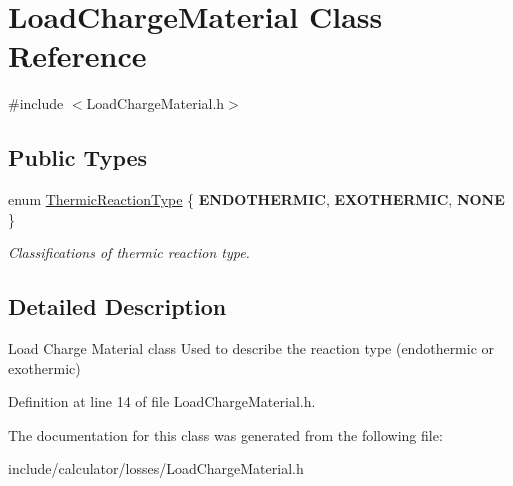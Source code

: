 \hypertarget{class_load_charge_material}{}\section{Load\+Charge\+Material Class Reference}
\label{class_load_charge_material}


{\ttfamily \#include $<$Load\+Charge\+Material.\+h$>$}

\subsection*{Public Types}
\begin{DoxyCompactItemize}
\item 
\mbox{\label{class_load_charge_material_a51d4263e865a5d86236622dd3fe23fd1}} 
enum \hyperlink{class_load_charge_material_a51d4263e865a5d86236622dd3fe23fd1}{Thermic\+Reaction\+Type} \{ {\bfseries E\+N\+D\+O\+T\+H\+E\+R\+M\+IC}, 
{\bfseries E\+X\+O\+T\+H\+E\+R\+M\+IC}, 
{\bfseries N\+O\+NE}
 \}\begin{DoxyCompactList}\small\item\em Classifications of thermic reaction type. \end{DoxyCompactList}
\end{DoxyCompactItemize}


\subsection{Detailed Description}
Load Charge Material class Used to describe the reaction type (endothermic or exothermic) 

Definition at line 14 of file Load\+Charge\+Material.\+h.



The documentation for this class was generated from the following file\+:\begin{DoxyCompactItemize}
\item 
include/calculator/losses/Load\+Charge\+Material.\+h\end{DoxyCompactItemize}

